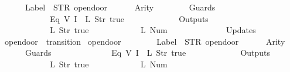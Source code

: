 \begin{isabellebody}
\ \ \ \ \ \ Label\ {\isacharequal}\ STR\ {\isacharprime}{\isacharprime}opendoor{\isacharprime}{\isacharprime}{\isacharcomma}\isanewline
\ \ \ \ \ \ Arity\ {\isacharequal}\ {}{\isacharcomma}\isanewline
\ \ \ \ \ \ Guards\ {\isacharequal}\ {\isacharbrackleft}\isanewline
\ \ \ \ \ \ \ \ \ \ \ \ {\isacharparenleft}Eq\ {\isacharparenleft}V\ {\isacharparenleft}I\ {}{\isacharparenright}{\isacharparenright}\ {\isacharparenleft}L\ {\isacharparenleft}Str\ {\isacharprime}{\isacharprime}true{\isacharprime}{\isacharprime}{\isacharparenright}{\isacharparenright}{\isacharparenright}\isanewline
\ \ \ \ \ \ {\isacharbrackright}{\isacharcomma}\isanewline
\ \ \ \ \ \ Outputs\ {\isacharequal}\ {\isacharbrackleft}\isanewline
\ \ \ \ \ \ \ \ \ \ \ \ {\isacharparenleft}L\ {\isacharparenleft}Str\ {\isacharprime}{\isacharprime}true{\isacharprime}{\isacharprime}{\isacharparenright}{\isacharparenright}{\isacharcomma}\isanewline
\ \ \ \ \ \ \ \ \ \ \ \ {\isacharparenleft}L\ {\isacharparenleft}Num\ {}{\isacharparenright}{\isacharparenright}\isanewline
\ \ \ \ \ \ {\isacharbrackright}{\isacharcomma}\isanewline
\ \ \ \ \ \ Updates\ {\isacharequal}\ {\isacharbrackleft}{\isacharbrackright}\isanewline
{\isasymrparr}{\isachardoublequoteclose}\isanewline
\isanewline
{}\isamarkupfalse%
\ {\isachardoublequoteopen}opendoor{}{\isachardoublequoteclose}\ {\isacharcolon}{\isacharcolon}\ {\isachardoublequoteopen}transition{\isachardoublequoteclose}\ \isanewline
{\isachardoublequoteopen}opendoor{}\ {\isasymequiv}\ {\isasymlparr}\isanewline
\ \ \ \ \ \ Label\ {\isacharequal}\ STR\ {\isacharprime}{\isacharprime}opendoor{\isacharprime}{\isacharprime}{\isacharcomma}\isanewline
\ \ \ \ \ \ Arity\ {\isacharequal}\ {}{\isacharcomma}\isanewline
\ \ \ \ \ \ Guards\ {\isacharequal}\ {\isacharbrackleft}\isanewline
\ \ \ \ \ \ \ \ \ \ \ \ {\isacharparenleft}Eq\ {\isacharparenleft}V\ {\isacharparenleft}I\ {}{\isacharparenright}{\isacharparenright}\ {\isacharparenleft}L\ {\isacharparenleft}Str\ {\isacharprime}{\isacharprime}true{\isacharprime}{\isacharprime}{\isacharparenright}{\isacharparenright}{\isacharparenright}\isanewline
\ \ \ \ \ \ {\isacharbrackright}{\isacharcomma}\isanewline
\ \ \ \ \ \ Outputs\ {\isacharequal}\ {\isacharbrackleft}\isanewline
\ \ \ \ \ \ \ \ \ \ \ \ {\isacharparenleft}L\ {\isacharparenleft}Str\ {\isacharprime}{\isacharprime}true{\isacharprime}{\isacharprime}{\isacharparenright}{\isacharparenright}{\isacharcomma}\isanewline
\ \ \ \ \ \ \ \ \ \ \ \ {\isacharparenleft}L\ {\isacharparenleft}Num\ {}{\isacharparenright}{\isacharparenright}\isanewline

\end{isabellebody}
